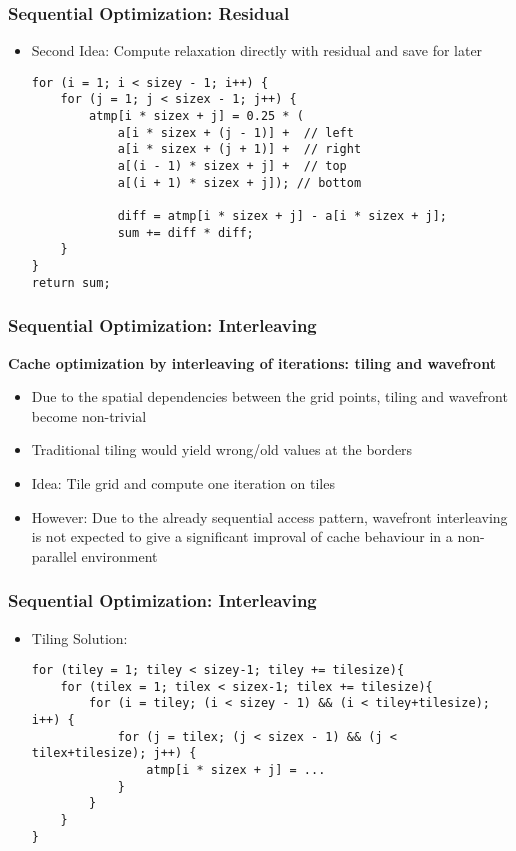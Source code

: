 \begin{frame}[fragile]
\frametitle{Sequential Optimization: Residual}
\begin {itemize}

\item Second Idea: Compute relaxation directly with residual and save for later
\begin{lstlisting}
for (i = 1; i < sizey - 1; i++) {
	for (j = 1; j < sizex - 1; j++) {
		atmp[i * sizex + j] = 0.25 * (
			a[i * sizex + (j - 1)] +  // left
			a[i * sizex + (j + 1)] +  // right
			a[(i - 1) * sizex + j] +  // top
			a[(i + 1) * sizex + j]); // bottom
			
			diff = atmp[i * sizex + j] - a[i * sizex + j];
			sum += diff * diff;
	}
}
return sum;
\end{lstlisting}

\end {itemize}
\end{frame}

\begin{frame}[fragile]
\frametitle{Sequential Optimization: Interleaving}


\textbf{Cache optimization by interleaving of iterations: tiling and wavefront}
\begin {itemize}
\item Due to the spatial dependencies between the grid points, tiling and wavefront become non-trivial
\item Traditional tiling would yield wrong/old values at the borders
\item Idea: Tile grid and compute one iteration on tiles
\item However: Due to the already sequential access pattern, wavefront interleaving is not expected to give a significant improval of cache behaviour in a non-parallel environment

\end {itemize}
\end{frame}

\begin{frame}[fragile]
\frametitle{Sequential Optimization: Interleaving}

\begin {itemize}
\item Tiling Solution:

\begin{lstlisting}
for (tiley = 1; tiley < sizey-1; tiley += tilesize){
	for (tilex = 1; tilex < sizex-1; tilex += tilesize){
		for (i = tiley; (i < sizey - 1) && (i < tiley+tilesize); i++) {
			for (j = tilex; (j < sizex - 1) && (j < tilex+tilesize); j++) {
				atmp[i * sizex + j] = ...
			}
		}
	}
}
\end{lstlisting}
\end {itemize}
\end{frame}

